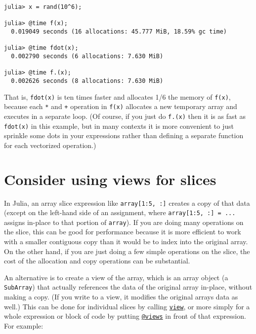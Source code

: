 \begin{verbatim}
julia> x = rand(10^6);

julia> @time f(x);
  0.019049 seconds (16 allocations: 45.777 MiB, 18.59% gc time)

julia> @time fdot(x);
  0.002790 seconds (6 allocations: 7.630 MiB)

julia> @time f.(x);
  0.002626 seconds (8 allocations: 7.630 MiB)
\end{verbatim}



That is, \texttt{fdot(x)} is ten times faster and allocates 1/6 the memory of \texttt{f(x)}, because each \texttt{*} and \texttt{+} operation in \texttt{f(x)} allocates a new temporary array and executes in a separate loop. (Of course, if you just do \texttt{f.(x)} then it is as fast as \texttt{fdot(x)} in this example, but in many contexts it is more convenient to just sprinkle some dots in your expressions rather than defining a separate function for each vectorized operation.)



\hypertarget{16479954806149442392}{}


\section{Consider using views for slices}



In Julia, an array {\textquotedbl}slice{\textquotedbl} expression like \texttt{array[1:5, :]} creates a copy of that data (except on the left-hand side of an assignment, where \texttt{array[1:5, :] = ...} assigns in-place to that portion of \texttt{array}). If you are doing many operations on the slice, this can be good for performance because it is more efficient to work with a smaller contiguous copy than it would be to index into the original array. On the other hand, if you are just doing a few simple operations on the slice, the cost of the allocation and copy operations can be substantial.



An alternative is to create a {\textquotedbl}view{\textquotedbl} of the array, which is an array object (a \texttt{SubArray}) that actually references the data of the original array in-place, without making a copy. (If you write to a view, it modifies the original array{\textquotesingle}s data as well.) This can be done for individual slices by calling \hyperlink{4861450464669906845}{\texttt{view}}, or more simply for a whole expression or block of code by putting \hyperlink{4544474300423667148}{\texttt{@views}} in front of that expression. For example:




